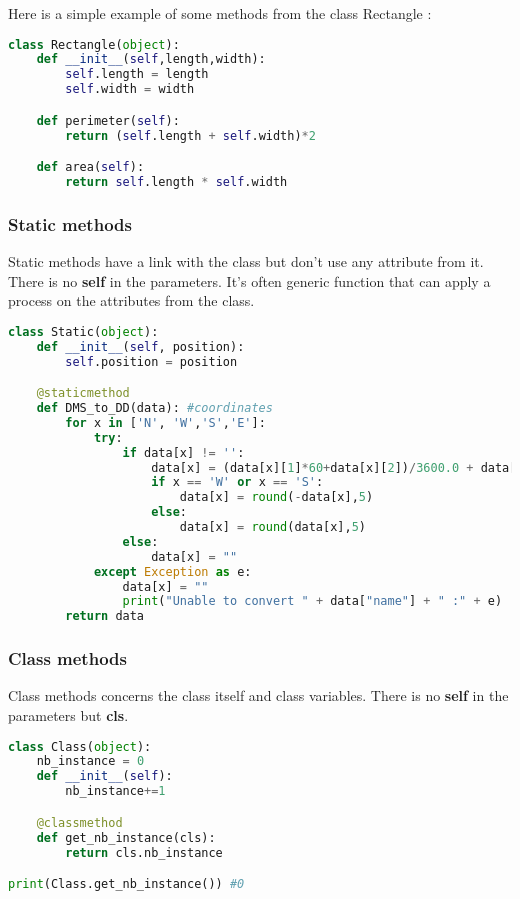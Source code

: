 \documentclass[a4paper, 12pt, titlepage]{scrartcl} %
\begin{document}
\vspace{5mm}

Here is a simple example of some methods from the class Rectangle : 
\begin{lstlisting}[language=Python]
class Rectangle(object):
	def __init__(self,length,width):
		self.length = length
		self.width = width

	def perimeter(self):
		return (self.length + self.width)*2

	def area(self):
		return self.length * self.width
\end{lstlisting} \vspace{5mm}

\subsubsection{Static methods}
Static methods have a link with the class but don't use any attribute from it. There is no \textbf{self} in the parameters. It's often generic function that can apply a process on the attributes from the class.

\begin{lstlisting}[language=Python]
class Static(object):
	def __init__(self, position):
		self.position = position

	@staticmethod
	def DMS_to_DD(data): #coordinates
		for x in ['N', 'W','S','E']:
			try:
				if data[x] != '':
					data[x] = (data[x][1]*60+data[x][2])/3600.0 + data[x][0]
					if x == 'W' or x == 'S':
						data[x] = round(-data[x],5)
					else:
						data[x] = round(data[x],5)
				else:
					data[x] = ""
			except Exception as e:
				data[x] = ""
				print("Unable to convert " + data["name"] + " :" + e)
		return data
\end{lstlisting} \vspace{5mm}

\subsubsection{Class methods}
Class methods concerns the class itself and class variables. There is no \textbf{self} in the parameters but \textbf{cls}.

\begin{lstlisting}[language=Python]
class Class(object):
	nb_instance = 0
	def __init__(self):
		nb_instance+=1

	@classmethod
	def get_nb_instance(cls):
		return cls.nb_instance

print(Class.get_nb_instance()) #0
\end{lstlisting} \vspace{5mm}
\end{document}
